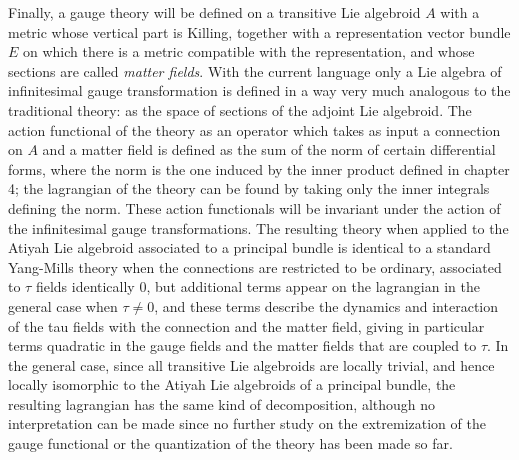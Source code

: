 Finally, a gauge theory will be defined on a transitive Lie algebroid $A$ with a metric whose vertical part is Killing, together with a representation vector bundle $E$ on which there is a metric compatible with the representation, and whose sections are called \textit{matter fields}. With the current language only a Lie algebra of infinitesimal gauge transformation is defined in a way very much analogous to the traditional theory: as the space of sections of the adjoint Lie algebroid. The action functional of the theory as an operator which takes as input a connection on $A$ and a matter field is defined as the sum of the norm of certain differential forms, where the norm is the one induced by the inner product defined in chapter 4; the lagrangian of the theory can be found by taking only the inner integrals defining the norm. These action functionals will be invariant under the action of the infinitesimal gauge transformations. The resulting theory when applied to the Atiyah Lie algebroid associated to a principal bundle is identical to a standard Yang-Mills theory when the connections are restricted to be ordinary, associated to $\tau$ fields identically $0$, but additional terms appear on the lagrangian in the general case when $\tau \neq 0$, and these terms describe the dynamics and interaction of the tau fields with the connection and the matter field, giving in particular terms quadratic in the gauge fields and the matter fields that are coupled to $\tau$. In the general case, since all transitive Lie algebroids are locally trivial, and hence locally isomorphic to the Atiyah Lie algebroids of a principal bundle, the resulting lagrangian has the same kind of decomposition, although no interpretation can be made since no further study on the extremization of the gauge functional or the quantization of the theory has been made so far.

